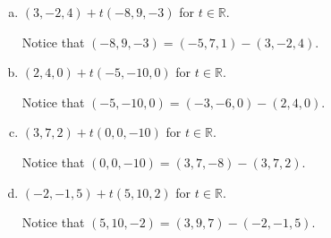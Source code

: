 \begin{Exercise}
	\begin{enumerate}[(a)]
		\item
		\begin{answer}
			$(3,-2,4) + t(-8,9,-3)$ for $t\in\mathbb{R}$.
		\end{answer}
		\begin{solution}
			Notice that $(-8,9,-3) = (-5,7,1) - (3,-2,4)$.
		\end{solution}
		
		\item 
		\begin{answer}
			$(2,4,0) + t(-5,-10,0)$ for $t\in\mathbb{R}$.
		\end{answer}
		\begin{solution}
			Notice that $(-5,-10,0) = (-3,-6,0) - (2,4,0)$.
		\end{solution}
		
		\item 
		\begin{answer}
			$(3,7,2) + t(0,0,-10)$ for $t\in\mathbb{R}$.
		\end{answer}
		\begin{solution}
			Notice that $(0,0,-10) = (3,7,-8) - (3,7,2)$.
		\end{solution}
		
		\item
		\begin{answer}
			$(-2,-1,5) + t(5,10,2)$ for $t\in\mathbb{R}$.
		\end{answer}
		\begin{solution}
			Notice that $(5,10,-2) = (3,9,7) - (-2,-1,5)$.
		\end{solution}
	\end{enumerate}
\end{Exercise}